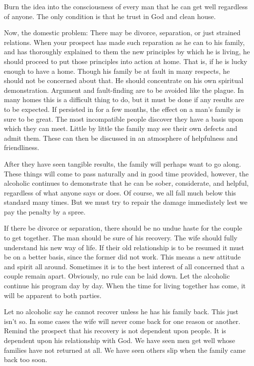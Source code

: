 \begin{biblechapter}
Burn the idea into the consciousness of every man that he can get well regardless of anyone.  The only condition is that he trust in God and clean house.

Now, the domestic problem: There may be divorce, separation, or just strained relations.  When your prospect has made such reparation as he can to his family, and has thoroughly explained to them the new principles by which he is living, he should proceed to put those principles into action at home.  That is, if he is lucky enough to have a home.  Though his family be at fault in many respects, he should not be concerned about that.  He should concentrate on his own spiritual demonstration.  Argument and fault-finding are to be avoided like the plague.  In many homes this is a difficult thing to do, but it must be done if any results are to be expected.  If persisted in for a few months, the effect on a man's family is sure to be great.  The most incompatible people discover they have a basis upon which they can meet.  Little by little the family may see their own defects and admit them.  These can then be discussed in an atmosphere of helpfulness and friendliness.

After they have seen tangible results, the family will perhaps want to go along.  These things will come to pass naturally and in good time provided, however, the alcoholic continues to demonstrate that he can be sober, considerate, and helpful, regardless of what anyone says or does.  Of course, we all fall much below this standard many times.  But we must try to repair the damage immediately lest we pay the penalty by a spree.

If there be divorce or separation, there should be no undue haste for the couple to get together.  The man should be sure of his recovery.  The wife should fully understand his new way of life.  If their old relationship is to be resumed it must be on a better basis, since the former did not work.  This means a new attitude and spirit all around.  Sometimes it is to the best interest of all concerned that a couple remain apart.  Obviously, no rule can be laid down.  Let the alcoholic continue his program day by day.  When the time for living together has come, it will be apparent to both parties.

Let no alcoholic say he cannot recover unless he has his family back.  This just isn't so.  In some cases the wife will never come back for one reason or another.  Remind the prospect that his recovery is not dependent upon people.  It is dependent upon his relationship with God.  We have seen men get well whose families have not returned at all.  We have seen others slip when the family came back too soon.


\end{biblechapter}
